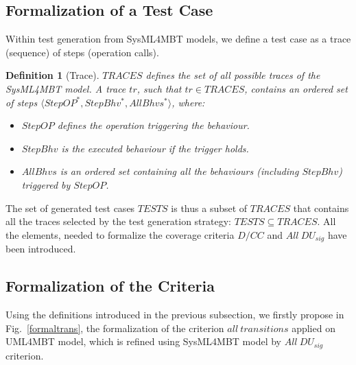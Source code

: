 \documentclass{llncs}
\newtheorem{de}{Definition}
\begin{document}
\subsection{Formalization of a Test Case}
\vspace*{-.25cm}
Within test generation from SysML4MBT models, we define a test
case as a trace (sequence) of steps (operation calls).
\vspace*{-.25cm}
\begin{de}[Trace]
$TRACES$ defines the set of all possible traces of the SysML4MBT
  model. A trace $tr$, such that $tr \in TRACES$, contains an ordered
  set of steps $\langle StepOP^*,StepBhv^*,AllBhvs^*
  \rangle$, where:\vspace*{-.25cm}
\begin{itemize}
  \item $StepOP$ defines the operation triggering the behaviour.
  \item $StepBhv$ is the executed behaviour if the trigger holds. 
  \item $AllBhvs$ is an ordered set containing all the behaviours
    (including $StepBhv$) triggered by $StepOP$.
\end{itemize}
\end{de}
\vspace{-0.3cm}
The set of generated test cases $TESTS$ is thus a subset of
$TRACES$ that contains all the traces selected by the test generation
strategy: $TESTS \subseteq TRACES$. All the elements, needed to
formalize the coverage criteria $D/CC$ and $All~DU_{sig}$ have
been introduced. 
\vspace*{-.3cm}
\subsection{Formalization of the Criteria}
\vspace*{-.25cm}
Using the definitions introduced in the previous subsection, we
firstly propose in Fig.~\ref{formaltrans}, the formalization of the 
criterion $all~transitions$ applied on UML4MBT model, which is refined
using SysML4MBT model by $All~DU_{sig}$ criterion.
\end{document}
